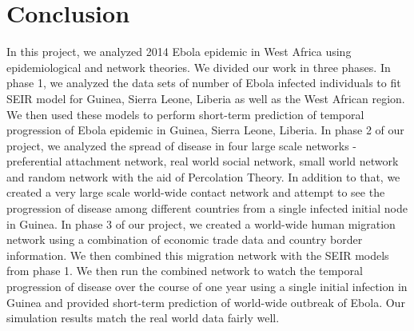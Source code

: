 \documentclass[10pt, journal,onecolumn]{IEEEtran}
\begin{document}
\section{Conclusion}
In this project, we analyzed 2014 Ebola epidemic in West Africa using epidemiological and network theories. We divided our work in three phases. In phase 1, we analyzed the data sets of number of Ebola infected individuals to fit  SEIR model for Guinea, Sierra Leone, Liberia as well as the West African region. We then used these models to perform short-term prediction of temporal progression of Ebola epidemic in  Guinea, Sierra Leone, Liberia. In phase 2 of our project, we analyzed the spread of disease in four large scale networks - preferential attachment network, real world social network, small world network and random network with the aid of Percolation Theory. In addition to that, we created a very large scale world-wide contact network and attempt to see the progression of disease among different countries from a single infected initial node in Guinea. In phase 3 of our project, we created a world-wide human migration network using a combination of economic trade data and country border information. We then combined this migration network with the SEIR models from phase 1. We then run the combined network to watch the temporal progression of disease over the course of one year using a single initial infection in Guinea and provided short-term prediction of world-wide outbreak of Ebola. Our simulation results match the real world data fairly well.








\end{document}
